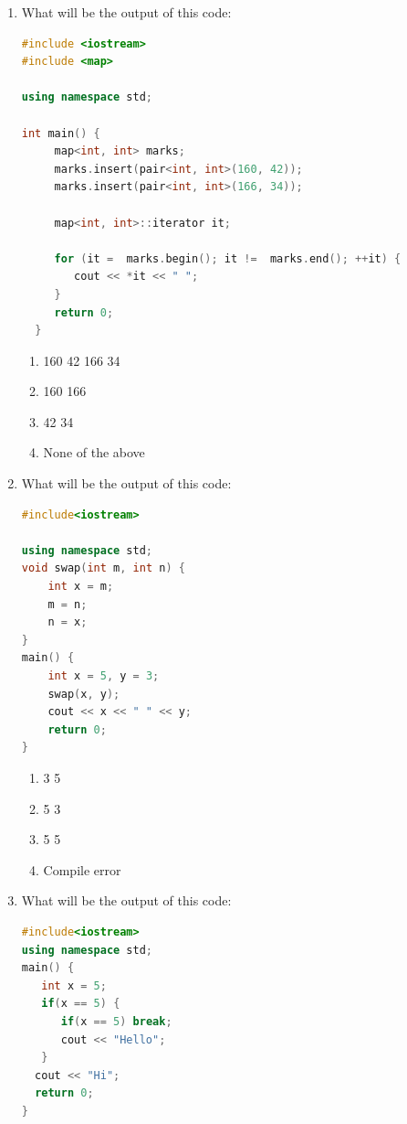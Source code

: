 \documentclass[10pt]{article}
\begin{document}
\begin{enumerate}
\item What will be the output of this code:
\begin{lstlisting}[language=C++]
#include <iostream> 
#include <map> 
   
using namespace std; 
   
int main() { 
     map<int, int> marks; 
     marks.insert(pair<int, int>(160, 42)); 
     marks.insert(pair<int, int>(166, 34)); 
   
     map<int, int>::iterator it; 

     for (it =  marks.begin(); it !=  marks.end(); ++it) { 
        cout << *it << " "; 
     } 
     return 0;     
  }

\end{lstlisting}
\begin{multicols}{4}
\begin{enumerate}
    \item 160 42 166 34
    \item 160 166
    \item 42 34
    \item None of the above
\end{enumerate}
\end{multicols}






\item What will be the output of this code:
\begin{lstlisting}[language=C++]
#include<iostream>

using namespace std;
void swap(int m, int n) {
    int x = m;
    m = n;
    n = x;
}
main() {
    int x = 5, y = 3;
    swap(x, y);
    cout << x << " " << y;
    return 0;
}
\end{lstlisting}
\begin{multicols}{4}
\begin{enumerate}
    \item 3 5
    \item 5 3
    \item 5 5
    \item Compile error
\end{enumerate}
\end{multicols}





\item What will be the output of this code:
\begin{lstlisting}[language=C++]
#include<iostream>
using namespace std;
main() { 
   int x = 5;
   if(x == 5) {	
      if(x == 5) break;
      cout << "Hello";
   } 
  cout << "Hi"; 
  return 0;
}


\end{lstlisting}
\end{enumerate}
\end{document}
